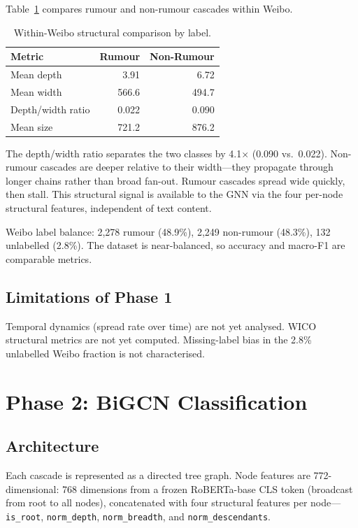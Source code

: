 \documentclass[conference]{IEEEtran}
\begin{document}
Table~\ref{tab:weibo_labels} compares rumour and non-rumour cascades within
Weibo.

\begin{table}[h]
\caption{Within-Weibo structural comparison by label.}
\label{tab:weibo_labels}
\centering
\small
\begin{tabular}{lrr}
\toprule
\textbf{Metric} & \textbf{Rumour} & \textbf{Non-Rumour} \\
\midrule
Mean depth         & 3.91  & 6.72  \\
Mean width         & 566.6 & 494.7 \\
Depth/width ratio  & 0.022 & 0.090 \\
Mean size          & 721.2 & 876.2 \\
\bottomrule
\end{tabular}
\end{table}

The depth/width ratio separates the two classes by 4.1$\times$ (0.090 vs.\
0.022).
Non-rumour cascades are deeper relative to their width---they propagate through
longer chains rather than broad fan-out.
Rumour cascades spread wide quickly, then stall.
This structural signal is available to the GNN via the four per-node structural
features, independent of text content.

Weibo label balance: 2,278 rumour (48.9\%), 2,249 non-rumour (48.3\%),
132 unlabelled (2.8\%).
The dataset is near-balanced, so accuracy and macro-F1 are comparable metrics.

\subsection{Limitations of Phase 1}

Temporal dynamics (spread rate over time) are not yet analysed.
WICO structural metrics are not yet computed.
Missing-label bias in the 2.8\% unlabelled Weibo fraction is not characterised.

\section{Phase 2: BiGCN Classification}

\subsection{Architecture}

Each cascade is represented as a directed tree graph.
Node features are 772-dimensional: 768 dimensions from a frozen RoBERTa-base
CLS token (broadcast from root to all nodes), concatenated with four structural
features per node---\texttt{is\_root}, \texttt{norm\_depth},
\texttt{norm\_breadth}, and \texttt{norm\_descendants}.
\end{document}
